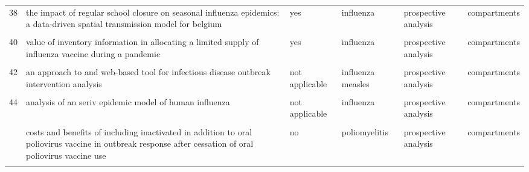 \documentclass[
]{article}
\begin{document}
\begin{landscape}
\begin{longtable}{l>{\raggedright\arraybackslash}p{3.3cm}l>{\raggedright\arraybackslash}p{3.3cm}>{\raggedright\arraybackslash}p{2cm}l}
38 & the impact of regular school closure on seasonal influenza epidemics: a data-driven spatial transmission model for belgium & yes & influenza & prospective analysis & compartments\\
\cellcolor{gray!6}{39} & \cellcolor{gray!6}{the potential impact of case-area targeted interventions in response to cholera outbreaks: a modeling study} & \cellcolor{gray!6}{yes} & \cellcolor{gray!6}{cholera} & \cellcolor{gray!6}{prospective analysis} & \cellcolor{gray!6}{agents}\\
40 & value of inventory information in allocating a limited supply of influenza vaccine during a pandemic & yes & influenza & prospective analysis & compartments\\
\addlinespace
\cellcolor{gray!6}{41} & \cellcolor{gray!6}{an age-structured model for cholera control with vaccination} & \cellcolor{gray!6}{not applicable} & \cellcolor{gray!6}{cholera} & \cellcolor{gray!6}{prospective analysis} & \cellcolor{gray!6}{compartments}\\
42 & an approach to and web-based tool for infectious disease outbreak intervention analysis & not applicable & influenza measles & prospective analysis & compartments\\
\cellcolor{gray!6}{43} & \cellcolor{gray!6}{an economic assessment of foot and mouth disease in japan} & \cellcolor{gray!6}{yes} & \cellcolor{gray!6}{fmd} & \cellcolor{gray!6}{prospective analysis} & \cellcolor{gray!6}{agents}\\
44 & analysis of an seriv epidemic model of human influenza & not applicable & influenza & prospective analysis & compartments\\
\cellcolor{gray!6}{45} & \cellcolor{gray!6}{control strategies of avian influenza pandemic model with time delay} & \cellcolor{gray!6}{not applicable} & \cellcolor{gray!6}{influenza} & \cellcolor{gray!6}{prospective analysis} & \cellcolor{gray!6}{compartments}\\
\addlinespace
46 & costs and benefits of including inactivated in addition to oral poliovirus vaccine in outbreak response after cessation of oral poliovirus vaccine use & no & poliomyelitis & prospective analysis & compartments\\
\cellcolor{gray!6}{47} & \cellcolor{gray!6}{deriving effective vaccine allocation strategies for pandemic influenza: comparison of an agent-based simulation and a compartmental model} & \cellcolor{gray!6}{yes} & \cellcolor{gray!6}{influenza} & \cellcolor{gray!6}{prospective analysis} & \cellcolor{gray!6}{individuals representation other}\\

\end{longtable}
\end{landscape}
\end{document}
